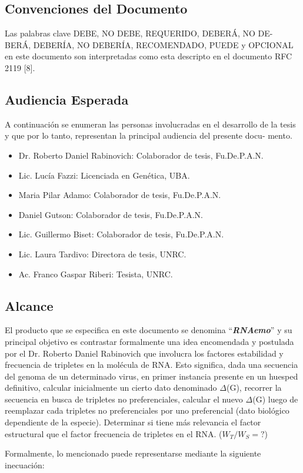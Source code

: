 \documentclass[10pt,a4paper,english,spanish]{article}
\newcommand{\rnaemo}{\textbf{\emph{RNAemo}}}
\begin{document}
\subsection{Convenciones del Documento}
Las palabras clave DEBE, NO DEBE, REQUERIDO, DEBERÁ, NO DE-
BERÁ, DEBERÍA, NO DEBERÍA, RECOMENDADO, PUEDE y OPCIONAL
en este documento son interpretadas como esta descripto en el documento RFC
2119 [8]. 

\subsection{Audiencia Esperada}
\par A continuación se enumeran las personas involucradas en el desarrollo de la
tesis y que por lo tanto, representan la principal audiencia del presente docu-
mento.
\begin{itemize}
	\item Dr. Roberto Daniel Rabinovich: Colaborador de tesis, Fu.De.P.A.N.
	\item Lic. Lucía Fazzi: Licenciada en Genética, UBA.
	\item Maria Pilar Adamo: Colaborador de tesis, Fu.De.P.A.N. 
	\item Daniel Gutson: Colaborador de tesis, Fu.De.P.A.N. 
	\item Lic. Guillermo Biset: Colaborador de tesis, Fu.De.P.A.N. 
	\item Lic. Laura Tardivo: Directora de tesis, UNRC. 
	\item Ac. Franco Gaspar Riberi: Tesista, UNRC.
\end{itemize}

\subsection{Alcance}
\par El producto que se especifica en este documento se denomina ``\rnaemo''
 y su principal objetivo es contrastar formalmente una idea encomendada y
postulada por el Dr. Roberto Daniel Rabinovich que involucra los factores
estabilidad y frecuencia de tripletes en la molécula de RNA. 
Esto significa, dada una secuencia del genoma de un determinado virus, en
 primer instancia presente en un huesped definitivo, calcular inicialmente un cierto dato denominado $\Delta$(G), 
recorrer la secuencia en busca de tripletes no preferenciales, calcular el nuevo
 $\Delta$(G) luego de reemplazar cada tripletes no preferenciales por uno
preferencial (dato biológico dependiente de la especie). Determinar si tiene más 
relevancia el factor estructural que el factor frecuencia de tripletes en el RNA. ($W_T / W_S = ?$)
\par Formalmente, lo mencionado puede representarse mediante la siguiente inecuación:
\end{document}
